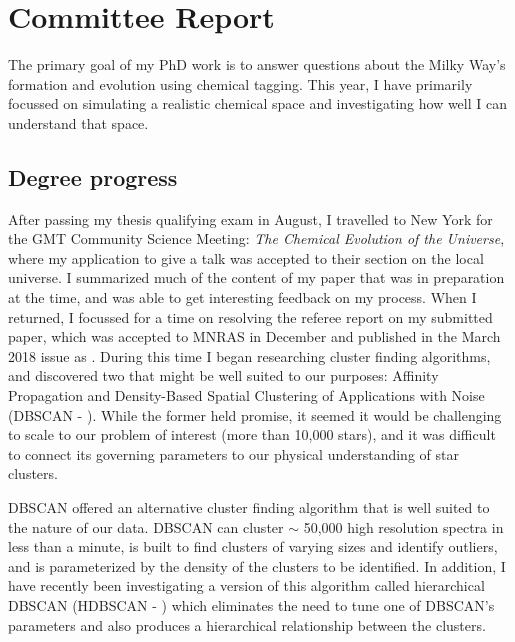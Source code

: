 \documentclass[11pt]{article}
\begin{document}
    
    \section*{Committee Report}
    
    The primary goal of my PhD work is to answer questions about the Milky Way's formation and evolution using chemical tagging. This year, I have primarily focussed on simulating a realistic chemical space and investigating how well I can understand that space.    

    \subsection*{Degree progress}
    
    After passing my thesis qualifying exam in August, I travelled to New York for the GMT Community Science Meeting: \emph{The Chemical Evolution of the Universe}, where my application to give a talk was accepted to their section on the local universe. I summarized much of the content of my paper that was in preparation at the time, and was able to get interesting feedback on my process. When I returned, I focussed for a time on resolving the referee report on my submitted paper, which was accepted to MNRAS in December and published in the March 2018 issue as \citet{Price-Jones2018}.  During this time I began researching cluster finding algorithms, and discovered two that might be well suited to our purposes: Affinity Propagation \citep{Frey2007} and Density-Based Spatial Clustering of Applications with Noise (DBSCAN - \citealt{Ester1996}). While the former held promise, it seemed it would be challenging to scale to our problem of interest (more than 10,000 stars), and it was difficult to connect its governing parameters to our physical understanding of star clusters. 
    
    DBSCAN offered an alternative cluster finding algorithm that is well suited to the nature of our data. DBSCAN can cluster $\sim$ 50,000 high resolution spectra in less than a minute, is built to find clusters of varying sizes and identify outliers, and is parameterized by the density of the clusters to be identified. In addition, I have recently been investigating a version of this algorithm called hierarchical DBSCAN (HDBSCAN - \citealt{Pei2013}) which eliminates the need to tune one of DBSCAN's parameters and also produces a hierarchical relationship between the clusters.
    
\end{document}
